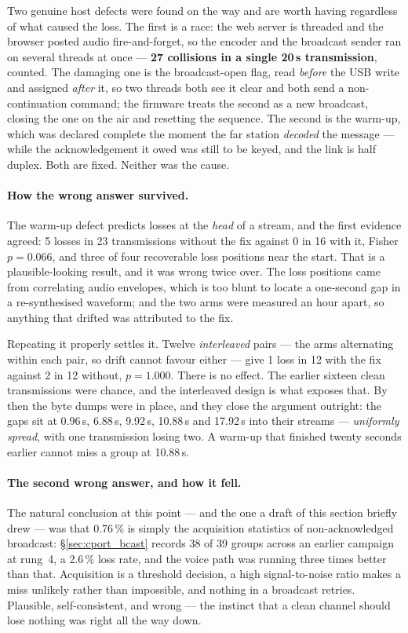 Two genuine host defects were found on the way and are worth having
regardless of what caused the loss.  The first is a race: the web
server is threaded and the browser posted audio fire-and-forget, so the
encoder and the broadcast sender ran on several threads at once ---
\textbf{27 collisions in a single 20\,s transmission}, counted.  The
damaging one is the broadcast-open flag, read \emph{before} the USB
write and assigned \emph{after} it, so two threads both see it clear and
both send a non-continuation command; the firmware treats the second as
a new broadcast, closing the one on the air and resetting the sequence.
The second is the warm-up, which was declared complete the moment the
far station \emph{decoded} the message --- while the acknowledgement it
owed was still to be keyed, and the link is half duplex.  Both are
fixed.  Neither was the cause.

\paragraph{How the wrong answer survived.}
The warm-up defect predicts losses at the \emph{head} of a stream, and
the first evidence agreed: 5 losses in 23 transmissions without the fix
against 0 in 16 with it, Fisher $p = 0.066$, and three of four
recoverable loss positions near the start.  That is a plausible-looking
result, and it was wrong twice over.  The loss positions came from
correlating audio envelopes, which is too blunt to locate a
one-second gap in a re-synthesised waveform; and the two arms were
measured an hour apart, so anything that drifted was attributed to the
fix.

Repeating it properly settles it.  Twelve \emph{interleaved} pairs ---
the arms alternating within each pair, so drift cannot favour either
--- give 1 loss in 12 with the fix against 2 in 12 without,
$p = 1.000$.  There is no effect.  The earlier sixteen clean
transmissions were chance, and the interleaved design is what exposes
that.  By then the byte dumps were in place, and they close the
argument outright: the gaps sit at 0.96\,s, 6.88\,s, 9.92\,s, 10.88\,s
and 17.92\,s into their streams --- \emph{uniformly spread}, with one
transmission losing two.  A warm-up that finished twenty seconds
earlier cannot miss a group at 10.88\,s.

\paragraph{The second wrong answer, and how it fell.}
The natural conclusion at this point --- and the one a draft of this
section briefly drew --- was that 0.76\,\% is simply the acquisition
statistics of non-acknowledged broadcast: \S\ref{sec:cport_bcast}
records 38 of 39 groups across an earlier campaign at rung~4, a
2.6\,\% loss rate, and the voice path was running three times better
than that.  Acquisition is a threshold decision, a high
signal-to-noise ratio makes a miss unlikely rather than impossible,
and nothing in a broadcast retries.  Plausible, self-consistent, and
wrong --- the instinct that a clean channel should lose nothing was
right all the way down.

